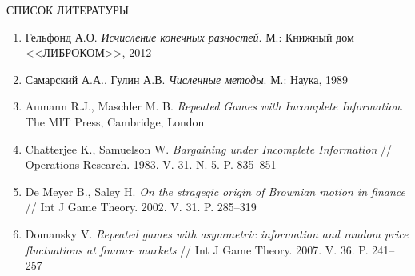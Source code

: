 \begin{center}
СПИСОК ЛИТЕРАТУРЫ
\end{center}

\begin{enumerate}
\item
Гельфонд А.О. \textit{Исчисление конечных разностей}. М.: Книжный дом <<ЛИБРОКОМ>>, 2012

\item
Самарский А.А., Гулин А.В. \textit{Численные методы}. М.: Наука, 1989

\item
Aumann R.J., Maschler M. B. \textit{Repeated Games with Incomplete Information}. The MIT Press, Cambridge, London

\item
Chatterjee K., Samuelson W. \textit{Bargaining under Incomplete Information} // Operations Research. 1983. V. 31. N. 5. P. 835--851

\item
De Meyer B., Saley H. \textit{On the stragegic origin of Brownian motion in finance} // Int J Game Theory. 2002. V. 31. P. 285--319

\item
Domansky V. \textit{Repeated games with asymmetric information and random price fluctuations at finance markets} // Int J Game Theory. 2007. V. 36. P. 241--257
\end{enumerate}

\makeenginfo